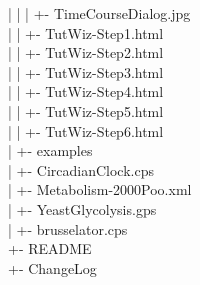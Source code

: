 \documentclass[12pt]{book}
\begin{document}
{\begin{tabbing}
 \> | \> \> | \> \> | \> +- TimeCourseDialog.jpg \\
 \> | \> \> | \> \> +- TutWiz-Step1.html \\
 \> | \> \> | \> \> +- TutWiz-Step2.html \\
 \> | \> \> | \> \> +- TutWiz-Step3.html \\
 \> | \> \> | \> \> +- TutWiz-Step4.html \\
 \> | \> \> | \> \> +- TutWiz-Step5.html \\
 \> | \> \> | \> \> +- TutWiz-Step6.html \\
 \> | \> \> +- examples \\
 \> | \> \> \> +- CircadianClock.cps \\
 \> | \> \> \> +- Metabolism-2000Poo.xml \\
 \> | \> \> \> +- YeastGlycolysis.gps \\
 \> | \> \> \> +- brusselator.cps \\
 \> +- README \\
 \> +- ChangeLog \\
\end{tabbing}
}
\end{document}
